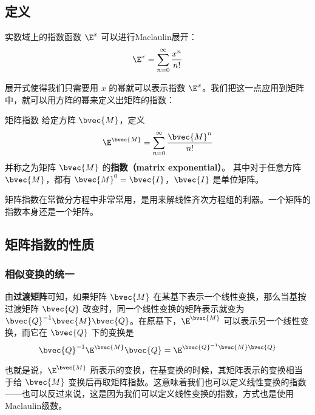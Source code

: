
\begin{issues}
\issueMissDepend
\end{issues}


\subsection{定义}
实数域上的指数函数 $\E^x$ 可以进行Maclaulin展开：\begin{equation}
\E^x=\sum\limits_{n=0}^\infty \frac{x^n}{n!}
\end{equation}

展开式使得我们只需要用 $x$ 的幂就可以表示指数 $\E^x$。我们把这一点应用到矩阵中，就可以用方阵的幂来定义出矩阵的指数：

\begin{definition}{矩阵指数}
给定方阵 $\bvec{M}$，定义
\begin{equation}\label{eq_MatExp_2}
\E^{\bvec{M}}=\sum_{n=0}^\infty \frac{\bvec{M}^n}{n!}
\end{equation}
并称之为矩阵 $\bvec{M}$ 的\textbf{指数（matrix exponential）}。 其中对于任意方阵 $\bvec{M}$，都有 $\bvec{M}^0=\bvec{I}$，$\bvec{I}$ 是单位矩阵。
\end{definition}

矩阵指数在常微分方程中非常常用，是用来解线性齐次方程组的利器。一个矩阵的指数本身还是一个矩阵。

\subsection{矩阵指数的性质}

\subsubsection{相似变换的统一}

由\textbf{过渡矩阵}可知，如果矩阵 $\bvec{M}$ 在某基下表示一个线性变换，那么当基按过渡矩阵 $\bvec{Q}$ 改变时，同一个线性变换的矩阵表示就变为 $\bvec{Q}^{-1}\bvec{M}\bvec{Q}$。在原基下，$\E^{\bvec{M}}$ 可以表示另一个线性变换，而它在 $\bvec{Q}$ 下的变换是
\begin{equation}\label{eq_MatExp_1}
\bvec{Q}^{-1}\E^{\bvec{M}}\bvec{Q}=\E^{\bvec{Q}^{-1}\bvec{M}\bvec{Q}}
\end{equation}

也就是说，$\E^{\bvec{M}}$ 所表示的变换，在基变换的时候，其矩阵表示的变换相当于给 $\bvec{M}$ 变换后再取矩阵指数。这意味着我们也可以定义线性变换的指数——也可以反过来说，这是因为我们可以定义线性变换的指数，方式也是使用Maclaulin级数。

